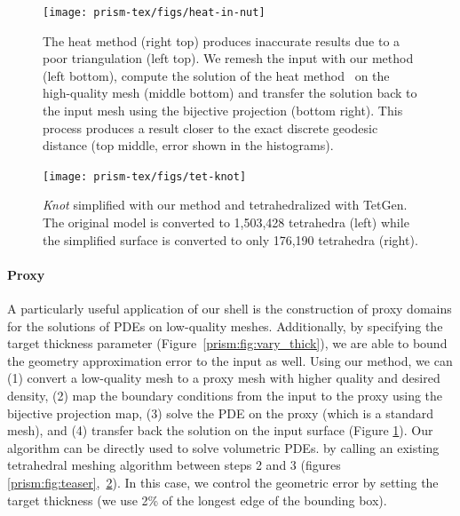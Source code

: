 

\begin{figure}
    \centering
    \texttt{[image: prism-tex/figs/heat-in-nut]}
    \caption{The heat method (right top) produces inaccurate results due to a poor triangulation (left top). We remesh the input with our method (left bottom), compute the {solution of the heat method~\cite{crane2013geodesics}} on the high-quality mesh (middle bottom) and transfer the solution back to the input mesh using the bijective projection (bottom right). This process produces a result closer to the exact discrete geodesic distance \cite{mitchell1987discrete} (top middle, {error shown in the histograms}).}
    \label{prism:fig:proxy-heat}
    
\end{figure}


\begin{figure}
    \centering
    \texttt{[image: prism-tex/figs/tet-knot]}
    \caption{\emph{Knot} simplified with our method and tetrahedralized with TetGen. 
    The original model is converted to 1,503,428 tetrahedra (left) while the simplified surface is converted to only
    176,190 tetrahedra (right).}
    \label{prism:fig:proxy-tetgen}
    
\end{figure}


\paragraph{Proxy}
A particularly useful application of our shell is the construction of proxy domains for the solutions of PDEs on low-quality meshes. 
Additionally, by specifying the target thickness parameter (Figure~\ref{prism:fig:vary_thick}),
we are able to bound the geometry approximation error to the input as well.
Using our method,
we can (1) convert a low-quality mesh to a proxy mesh with higher quality and desired density, (2) map the boundary conditions from the input to the proxy using the bijective projection map, (3) solve the PDE on the proxy (which is a standard mesh), and (4) transfer back the solution on the input surface (Figure \ref{prism:fig:proxy-heat}). 
{Our} algorithm can be directly used to solve volumetric PDEs.
by calling an existing tetrahedral meshing algorithm between steps 2 and 3 (figures \ref{prism:fig:teaser},~\ref{prism:fig:proxy-tetgen}). 
In this case, we control the geometric error by setting the target thickness (we use 2\% of the longest edge of the bounding box).

